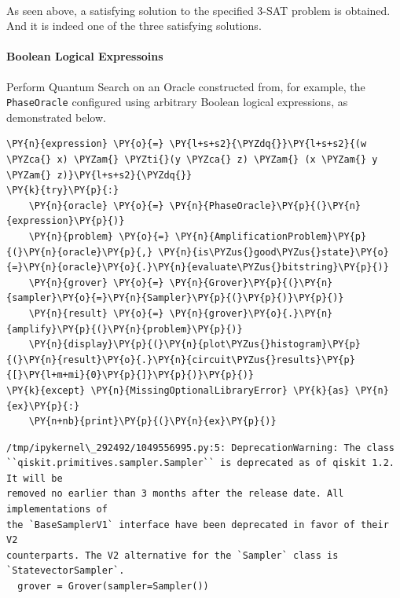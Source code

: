     \begin{center}
    \end{center}
    { \hspace*{\fill} \\}
    
    As seen above, a satisfying solution to the specified 3-SAT problem is
obtained. And it is indeed one of the three satisfying solutions.

    \hypertarget{boolean-logical-expressoins}{%
\paragraph{Boolean Logical
Expressoins}\label{boolean-logical-expressoins}}

Perform Quantum Search on an Oracle constructed from, for example, the
\texttt{PhaseOracle} configured using arbitrary Boolean logical
expressions, as demonstrated below.

    \begin{tcolorbox}[breakable, size=fbox, boxrule=1pt, pad at break*=1mm,colback=cellbackground, colframe=cellborder]
\begin{Verbatim}[commandchars=\\\{\}]
\PY{n}{expression} \PY{o}{=} \PY{l+s+s2}{\PYZdq{}}\PY{l+s+s2}{(w \PYZca{} x) \PYZam{} \PYZti{}(y \PYZca{} z) \PYZam{} (x \PYZam{} y \PYZam{} z)}\PY{l+s+s2}{\PYZdq{}}
\PY{k}{try}\PY{p}{:}
    \PY{n}{oracle} \PY{o}{=} \PY{n}{PhaseOracle}\PY{p}{(}\PY{n}{expression}\PY{p}{)}
    \PY{n}{problem} \PY{o}{=} \PY{n}{AmplificationProblem}\PY{p}{(}\PY{n}{oracle}\PY{p}{,} \PY{n}{is\PYZus{}good\PYZus{}state}\PY{o}{=}\PY{n}{oracle}\PY{o}{.}\PY{n}{evaluate\PYZus{}bitstring}\PY{p}{)}
    \PY{n}{grover} \PY{o}{=} \PY{n}{Grover}\PY{p}{(}\PY{n}{sampler}\PY{o}{=}\PY{n}{Sampler}\PY{p}{(}\PY{p}{)}\PY{p}{)}
    \PY{n}{result} \PY{o}{=} \PY{n}{grover}\PY{o}{.}\PY{n}{amplify}\PY{p}{(}\PY{n}{problem}\PY{p}{)}
    \PY{n}{display}\PY{p}{(}\PY{n}{plot\PYZus{}histogram}\PY{p}{(}\PY{n}{result}\PY{o}{.}\PY{n}{circuit\PYZus{}results}\PY{p}{[}\PY{l+m+mi}{0}\PY{p}{]}\PY{p}{)}\PY{p}{)}
\PY{k}{except} \PY{n}{MissingOptionalLibraryError} \PY{k}{as} \PY{n}{ex}\PY{p}{:}
    \PY{n+nb}{print}\PY{p}{(}\PY{n}{ex}\PY{p}{)}
\end{Verbatim}
\end{tcolorbox}

    \begin{Verbatim}[commandchars=\\\{\}]
/tmp/ipykernel\_292492/1049556995.py:5: DeprecationWarning: The class
``qiskit.primitives.sampler.Sampler`` is deprecated as of qiskit 1.2. It will be
removed no earlier than 3 months after the release date. All implementations of
the `BaseSamplerV1` interface have been deprecated in favor of their V2
counterparts. The V2 alternative for the `Sampler` class is
`StatevectorSampler`.
  grover = Grover(sampler=Sampler())
    \end{Verbatim}

    \begin{center}
    \end{center}
    { \hspace*{\fill} \\}
    

